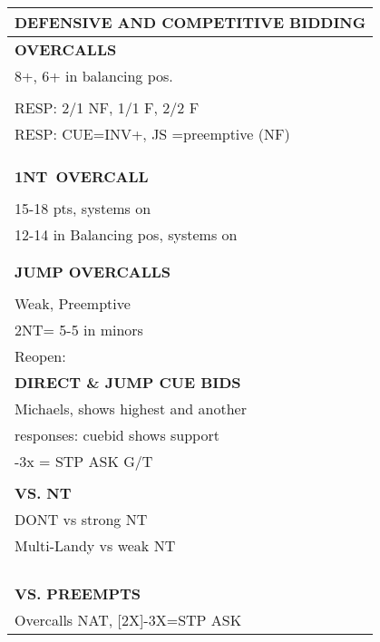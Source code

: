 \documentclass{article}
\newcommand\N{{\footnotesize NT}}
\begin{document}
\noindent
\small{
\begin{minipage}{90mm}
	\begin{tabular}{| p{88mm} |}
		\hline
		\cellcolor[gray]{0.9} \textbf{DEFENSIVE AND COMPETITIVE BIDDING} \\ \hline
		\textbf{OVERCALLS} \\ \hline
                8+, 6+ in balancing pos.
		\\ \hline
		\\ \hline
                RESP: 2/1 NF, 1/1 F, 2/2 F
		\\ \hline
                RESP: CUE=INV+, JS =preemptive (NF)
		\\ \hline
		\\ \hline
		\\ \hline
		\\ \hline
		\textbf{1\N \ OVERCALL} \\ \hline
		\\ \hline
                15-18 pts, systems on
		\\ \hline
                12-14 in Balancing pos, systems on
		\\ \hline
		\\ \hline
		\\ \hline
		\textbf{JUMP OVERCALLS} \\ \hline
		\\ \hline
                Weak, Preemptive
		\\ \hline
                2NT= 5-5 in minors
		\\ \hline
		Reopen: \\ \hline
		\textbf{DIRECT \& JUMP CUE BIDS} \\ \hline
                Michaels, shows highest and another
		\\ \hline
                responses: cuebid shows support
		\\ \hline
                [2x]-3x = STP ASK G/T 
		\\ \hline
		\\ \hline
		\textbf{VS. NT} \\ \hline
                DONT vs strong NT
		\\ \hline
                Multi-Landy vs weak NT
		\\ \hline
		\\ \hline
		\\ \hline
		\\ \hline
		\\ \hline
		\textbf{VS. PREEMPTS} \\ \hline
                Overcalls NAT, [2X]-3X=STP ASK

\end{tabular}
\end{minipage}}
\end{document}
